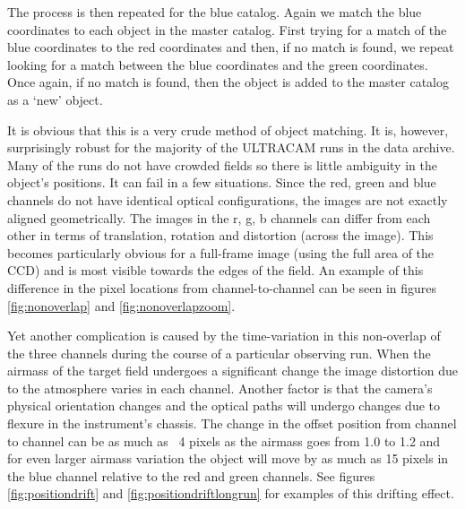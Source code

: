 The process is then repeated for the blue catalog. Again we match the blue coordinates to each object in the master catalog. First trying for a match of the blue coordinates to the red coordinates and then, if no match is found, we repeat looking for a match between the blue coordinates and the green coordinates. Once again, if no match is found, then the object is added to the master catalog as a `new' object.  

It is obvious that this is a very crude method of object matching. It is, however, surprisingly robust for the majority of the ULTRACAM runs in the data archive. Many of the runs do not have crowded fields so there is little ambiguity in the object's positions. It can fail in a few situations. Since the red, green and blue channels do not have identical optical configurations, the images are not exactly aligned geometrically. The images in the r, g, b channels can differ from each other in terms of translation, rotation and distortion (across the image). This becomes particularly obvious for a full-frame image (using the full area of the CCD) and is most visible towards the edges of the field. An example of this difference in the pixel locations from channel-to-channel can be seen in figures \ref{fig:nonoverlap} and \ref{fig:nonoverlapzoom}.

Yet another complication is caused by the time-variation in this non-overlap of the three channels during the course of a particular observing run. When the airmass of the target field undergoes a significant change the image distortion due to the atmosphere varies in each channel. Another factor is that the camera's physical orientation changes and the optical paths will undergo changes due to flexure in the instrument's chassis. The change in the offset position from channel to channel can be as much as ~4 pixels as the airmass goes from 1.0 to 1.2 and for even larger airmass variation the object will move by as much as 15 pixels in the blue channel relative to the red and green channels. See figures \ref{fig:positiondrift} and \ref{fig:positiondriftlongrun} for examples of this drifting effect. 

